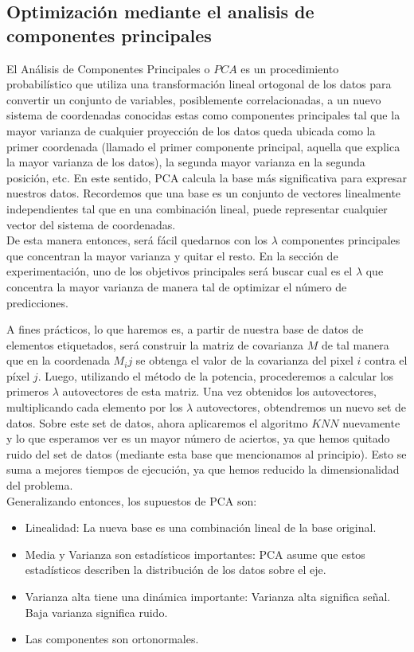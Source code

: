 \subsection {Optimización mediante el analisis de componentes principales}

El Análisis de Componentes Principales o $PCA$ es un procedimiento probabilístico que utiliza una transformación lineal ortogonal de los datos para convertir un conjunto de variables, posiblemente correlacionadas, a un nuevo sistema de coordenadas conocidas estas como componentes principales tal que la mayor varianza de cualquier proyección de los datos queda ubicada como la primer coordenada (llamado el primer componente principal, aquella que explica la mayor varianza de los datos), la segunda mayor varianza en la segunda posición, etc. En este sentido, PCA calcula la base más significativa para expresar nuestros datos. Recordemos que una base es un conjunto de vectores linealmente independientes tal que en una combinación lineal, puede representar cualquier vector del sistema de coordenadas.
\\
De esta manera entonces, será fácil quedarnos con los $\lambda$ componentes principales que concentran la mayor varianza y quitar el resto. En la sección de experimentación, uno de los objetivos principales será buscar cual es el $\lambda$ que concentra la mayor varianza de manera tal de optimizar el número de predicciones. 

A fines prácticos, lo que haremos es, a partir de nuestra base de datos de elementos etiquetados, será construir la matriz de covarianza $M$ de tal manera que en la coordenada $M_ij$ se obtenga el valor de la covarianza del pixel $i$ contra el píxel $j$.
Luego, utilizando el método de la potencia, procederemos a calcular los primeros $\lambda$ autovectores de esta matriz. Una vez obtenidos los autovectores, multiplicando cada elemento por los $\lambda$ autovectores, obtendremos un nuevo set de datos.
Sobre este set de datos, ahora aplicaremos el algoritmo $KNN$ nuevamente y lo que esperamos ver es un mayor número de aciertos, ya que hemos quitado ruido del set de datos (mediante esta base que mencionamos al principio). Esto se suma a mejores tiempos de ejecución, ya que hemos reducido la dimensionalidad del problema.
\\
Generalizando entonces, los supuestos de PCA son:
\begin{itemize}
 \item Linealidad: La nueva base es una combinación lineal de la base original.
 \item Media y Varianza son estadísticos importantes: PCA asume que estos estadísticos describen la distribución de los datos sobre el eje.
 \item Varianza alta tiene una dinámica importante: Varianza alta significa se\~nal. Baja varianza significa ruido.
 \item Las componentes son ortonormales.
\end{itemize}

